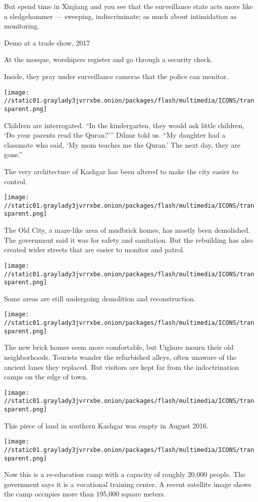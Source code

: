 But spend time in Xinjiang and you see that the surveillance state acts
more like a sledgehammer --- sweeping, indiscriminate; as much about
intimidation as monitoring.

Demo at a trade show, 2017

At the mosque, worshipers register and go through a security check.

Inside, they pray under surveillance cameras that the police can
monitor.

\texttt{[image: //static01.graylady3jvrrxbe.onion/packages/flash/multimedia/ICONS/transparent.png]}

Children are interrogated. ``In the kindergarten, they would ask little
children, `Do your parents read the Quran?''' Dilnur told us. ``My
daughter had a classmate who said, `My mom teaches me the Quran.' The
next day, they are gone.''

The very architecture of Kashgar has been altered to make the city
easier to control.

\texttt{[image: //static01.graylady3jvrrxbe.onion/packages/flash/multimedia/ICONS/transparent.png]}

The Old City, a maze-like area of mudbrick homes, has mostly been
demolished. The government said it was for safety and sanitation. But
the rebuilding has also created wider streets that are easier to monitor
and patrol.

\texttt{[image: //static01.graylady3jvrrxbe.onion/packages/flash/multimedia/ICONS/transparent.png]}

Some areas are still undergoing demolition and reconstruction.

\texttt{[image: //static01.graylady3jvrrxbe.onion/packages/flash/multimedia/ICONS/transparent.png]}

The new brick homes seem more comfortable, but Uighurs mourn their old
neighborhoods. Tourists wander the refurbished alleys, often unaware of
the ancient lanes they replaced. But visitors are kept far from the
indoctrination camps on the edge of town.

\texttt{[image: //static01.graylady3jvrrxbe.onion/packages/flash/multimedia/ICONS/transparent.png]}

This piece of land in southern Kashgar was empty in August 2016.

\texttt{[image: //static01.graylady3jvrrxbe.onion/packages/flash/multimedia/ICONS/transparent.png]}

Now this is a re-education camp with a capacity of roughly 20,000
people. The government says it is a vocational training center. A recent
satellite image shows the camp occupies more than 195,000 square meters.

